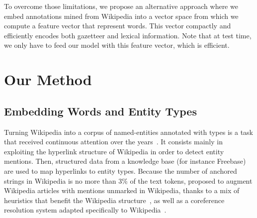 \documentclass[11pt]{article}
\newcommand{\felipe}[2]{}
\begin{document}
	
	To overcome those limitations, we propose an alternative approach where we embed annotations mined from Wikipedia into a vector space from which we compute a feature vector that represent words. This vector compactly and efficiently encodes both gazetteer and lexical information. Note that at test time, we only have to feed our model with this feature vector, which is efficient. 
	
	
	
\section{Our Method}		
	\label{sec:method}
	


	
	\subsection{Embedding Words and Entity Types}
	
	Turning Wikipedia into a corpus of named-entities annotated with types is a task that received continuous attention over the years~\cite{nothman2008transforming,al2015polyglot,ghaddar2017winer}. It consists mainly in exploiting the hyperlink structure of Wikipedia in order to detect entity mentions. Then, structured data from a knowledge base (for instance Freebase) are used to map hyperlinks to entity types. Because the number of anchored strings in Wikipedia is no more than 3\% of the text tokens\felipe{REFERENCE?}{il me semble qu'il y a avait une reference qui disait un truc comme cela},  proposed to augment Wikipedia articles with  mentions unmarked in Wikipedia, thanks to a mix of heuristics that benefit the Wikipedia structure~\cite{ghaddar2016coreference}, as well as a coreference resolution system adapted specifically to Wikipedia~\cite{GHADDAR16.192}.
	
\end{document}
